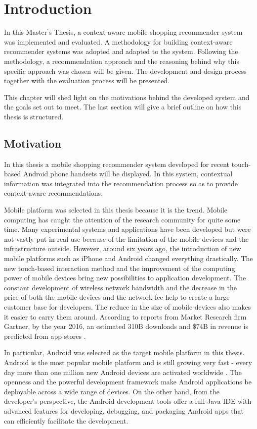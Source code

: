 \chapter{Introduction}\label{chapter:introduction}

In this Master$^\prime$s Thesis, a context-aware mobile shopping recommender system was implemented and evaluated. A methodology for building context-aware recommender systems was adopted and adapted to the system. Following the methodology, a recommendation approach and the reasoning behind why this specific approach was chosen will be given. The development and design process together with the evaluation process will be presented.

This chapter will shed light on the motivations behind the developed system and the goals set out to meet. The last section will give a brief outline on how this thesis is structured.

\section{Motivation} \label{sec:mv}

In this thesis a mobile shopping recommender system developed for recent touch-based Android phone handsets will be displayed. In this system, contextual information was integrated into the recommendation process so as to provide context-aware recommendations.

Mobile platform was selected in this thesis because it is the trend. Mobile computing has caught the attention of the research community for quite some time. Many experimental systems and applications have been developed but were not vastly put in real use because of the limitation of the mobile devices and the infrastructure outside. However, around six years ago, the introduction of new mobile platforms such as iPhone and Android changed everything drastically. The new touch-based interaction method and the improvement of the computing power of mobile devices bring new possibilities to application development. The constant development of wireless network bandwidth and the decrease in the price of both the mobile devices and the network fee help to create a large customer base for developers. The reduce in the size of mobile devices also makes it easier to carry them around. According to reports from Market Research firm Gartner, by the year 2016, an estimated 310B downloads and \$74B in revenue is predicted from app stores \cite{ref:39}. 

In particular, Android was selected as the target mobile platform in this thesis. Android is the most popular mobile platform and is still growing very fast - every day more than one million new Android devices are activated worldwide \cite{ref:42}. The openness and the powerful development framework make Android applications be deployable across a wide range of devices. On the other hand, from the developer's perspective, the Android development tools offer a full Java IDE with advanced features for developing, debugging, and packaging Android apps that can efficiently facilitate the development.

